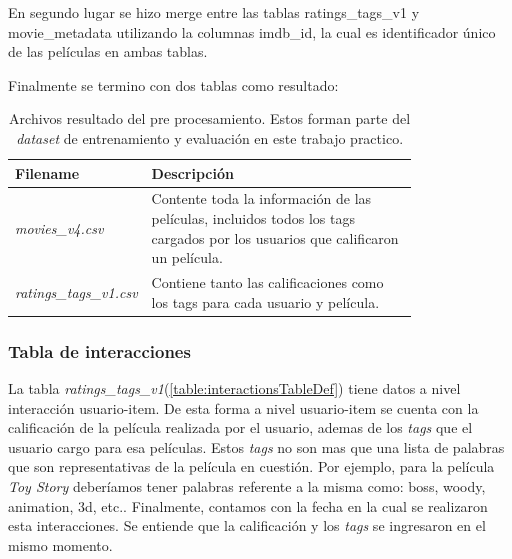 \documentclass[11pt,a4paper,twoside]{thesis}
\begin{document}
En segundo lugar se hizo merge entre las tablas ratings\_tags\_v1 y movie\_metadata utilizando la columnas imdb\_id, la cual es identificador único de las películas en ambas tablas.

Finalmente se termino con dos tablas como resultado:


\begin{table}[!htb]
	\centering
	\footnotesize
	\begin{tabular}{l | p{0.8\linewidth}}
	\hline
		Filename            & Descripción \\
	\hline
	\textit{movies\_v4.csv} & Contente toda la información de las películas, incluidos todos los tags cargados por los usuarios que calificaron un película. \\
	\textit{ratings\_tags\_v1.csv} & Contiene tanto las calificaciones como los tags para cada usuario y película. \\
	\hline
	\end{tabular}
	\caption{
		Archivos resultado del pre procesamiento. Estos forman parte del \textit{dataset} de entrenamiento y evaluación en este trabajo practico.
	}
	\label{table:tableRatings}
\end{table}

\subsubsection{Tabla de interacciones}

La tabla \textit{ratings\_tags\_v1}(\ref{table:interactionsTableDef}) tiene datos a nivel interacción usuario-item. De esta forma a nivel usuario-item se cuenta con la calificación de la película realizada por el usuario, ademas de los \textit{tags} que el usuario cargo para esa películas. Estos \textit{tags} no son mas que una lista de palabras que son representativas de la película en cuestión. 
Por ejemplo, para la película \textit{Toy Story} deberíamos tener palabras referente a la misma como: boss, woody, 
animation, 3d, etc.. Finalmente, contamos con la fecha en la cual se realizaron esta interacciones. Se entiende 
que la calificación y los \textit{tags} se ingresaron en el mismo momento.
\end{document}
